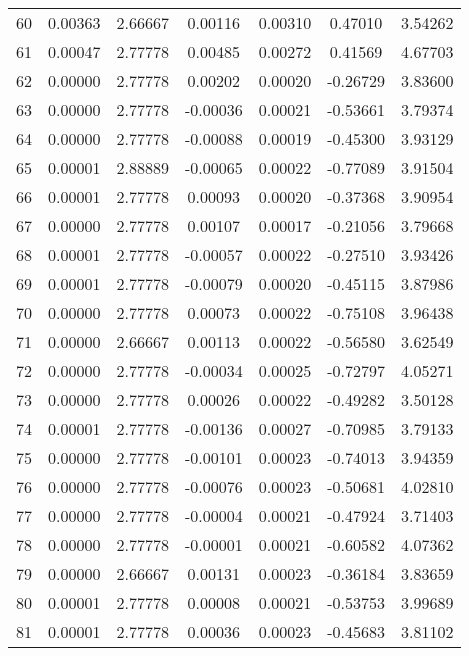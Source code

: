 \begin{longtable}{c c c c c c c}
60  &  0.00363 &      2.66667 &  0.00116 &   0.00310 &   0.47010 &   3.54262 \\
61  &  0.00047 &      2.77778 &  0.00485 &   0.00272 &   0.41569 &   4.67703 \\
62  &  0.00000 &      2.77778 &  0.00202 &   0.00020 &  -0.26729 &   3.83600 \\
63  &  0.00000 &      2.77778 & -0.00036 &   0.00021 &  -0.53661 &   3.79374 \\
64  &  0.00000 &      2.77778 & -0.00088 &   0.00019 &  -0.45300 &   3.93129 \\
65  &  0.00001 &      2.88889 & -0.00065 &   0.00022 &  -0.77089 &   3.91504 \\
66  &  0.00001 &      2.77778 &  0.00093 &   0.00020 &  -0.37368 &   3.90954 \\
67  &  0.00000 &      2.77778 &  0.00107 &   0.00017 &  -0.21056 &   3.79668 \\
68  &  0.00001 &      2.77778 & -0.00057 &   0.00022 &  -0.27510 &   3.93426 \\
69  &  0.00001 &      2.77778 & -0.00079 &   0.00020 &  -0.45115 &   3.87986 \\
70  &  0.00000 &      2.77778 &  0.00073 &   0.00022 &  -0.75108 &   3.96438 \\
71  &  0.00000 &      2.66667 &  0.00113 &   0.00022 &  -0.56580 &   3.62549 \\
72  &  0.00000 &      2.77778 & -0.00034 &   0.00025 &  -0.72797 &   4.05271 \\
73  &  0.00000 &      2.77778 &  0.00026 &   0.00022 &  -0.49282 &   3.50128 \\
74  &  0.00001 &      2.77778 & -0.00136 &   0.00027 &  -0.70985 &   3.79133 \\
75  &  0.00000 &      2.77778 & -0.00101 &   0.00023 &  -0.74013 &   3.94359 \\
76  &  0.00000 &      2.77778 & -0.00076 &   0.00023 &  -0.50681 &   4.02810 \\
77  &  0.00000 &      2.77778 & -0.00004 &   0.00021 &  -0.47924 &   3.71403 \\
78  &  0.00000 &      2.77778 & -0.00001 &   0.00021 &  -0.60582 &   4.07362 \\
79  &  0.00000 &      2.66667 &  0.00131 &   0.00023 &  -0.36184 &   3.83659 \\
80  &  0.00001 &      2.77778 &  0.00008 &   0.00021 &  -0.53753 &   3.99689 \\
81  &  0.00001 &      2.77778 &  0.00036 &   0.00023 &  -0.45683 &   3.81102 \\

\end{longtable}
